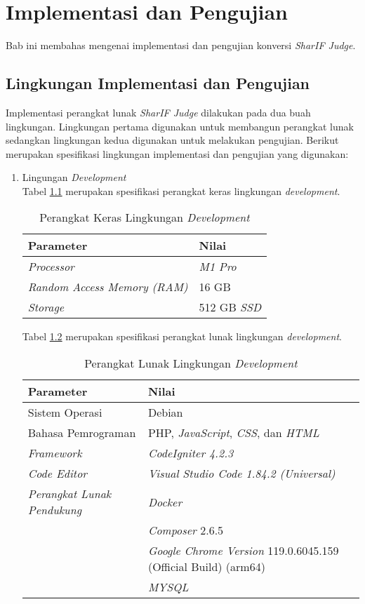 \chapter{Implementasi dan Pengujian}
\label{chap:implementasidanpengujian}
Bab ini membahas mengenai implementasi dan pengujian konversi \textit{SharIF Judge}.
\section{Lingkungan Implementasi dan Pengujian}
Implementasi perangkat lunak \textit{SharIF Judge} dilakukan pada dua buah lingkungan. Lingkungan pertama digunakan untuk membangun perangkat lunak sedangkan lingkungan kedua digunakan untuk melakukan pengujian. Berikut merupakan spesifikasi lingkungan implementasi dan pengujian yang digunakan:

\begin{enumerate}
	\item Lingungan \textit{Development}\\
	Tabel \ref{tab:devhard} merupakan spesifikasi perangkat keras lingkungan \textit{development}.
	\begin{table}[H]
 	\caption{Perangkat Keras Lingkungan \textit{Development}}
	\label{tab:devhard}
    \centering
    	\begin{tabular}{|l|l|}
    	\hline
        	\textbf{Parameter} & \textbf{Nilai} \\ \hline
        	\textit{Processor} & \textit{M1 Pro} \\ \hline
        	\textit{Random Access Memory (RAM)} & 16 GB \\ \hline
        	\textit{Storage} & 512 GB \textit{SSD} \\ \hline
    	\end{tabular}
	\end{table}
	Tabel \ref{tab:devsoft} merupakan spesifikasi perangkat lunak lingkungan \textit{development}.
 	\begin{table}[H]
 	\caption{Perangkat Lunak Lingkungan \textit{Development}}
	\label{tab:devsoft}
    \centering
    	\begin{tabular}{|l|l|}
    	\hline
        	\textbf{Parameter} & \textbf{Nilai} \\ \hline
        	Sistem Operasi & Debian \\ \hline
        	Bahasa Pemrograman & PHP, \textit{JavaScript}, \textit{CSS}, dan \textit{HTML} \\ \hline
        	\textit{Framework} & \textit{CodeIgniter 4.2.3} \\ \hline
        	\textit{Code Editor} & \textit{Visual Studio Code 1.84.2 (Universal)} \\ \hline
        	\textit{Perangkat Lunak Pendukung} & \textit{Docker}\\ & \textit{Composer} 2.6.5\\ & \textit{Google Chrome Version} 119.0.6045.159 (Official Build) (arm64) \\ & \textit{MYSQL } \\ \hline
    	\end{tabular}
	\end{table}
	

\end{enumerate}
